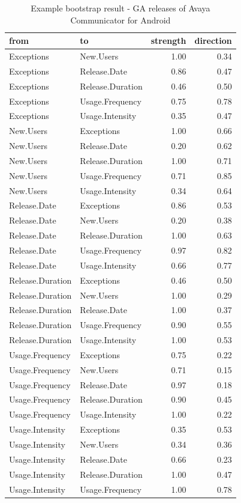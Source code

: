 \documentclass[smallextended]{svjour3}       %
\begin{document}
\begin{table}[ht]
\caption{Example bootstrap result - GA releases of Avaya Communicator for Android}\label{t:boot}
\centering
\begin{tabular}{llrr}
  \hline
 from & to & strength & direction \\ 
  \hline
Exceptions & New.Users & 1.00 & 0.34 \\ 
  Exceptions & Release.Date & 0.86 & 0.47 \\ 
  Exceptions & Release.Duration & 0.46 & 0.50 \\ 
  Exceptions & Usage.Frequency & 0.75 & 0.78 \\ 
  Exceptions & Usage.Intensity & 0.35 & 0.47 \\ 
  New.Users & Exceptions & 1.00 & 0.66 \\ 
  New.Users & Release.Date & 0.20 & 0.62 \\ 
  New.Users & Release.Duration & 1.00 & 0.71 \\ 
  New.Users & Usage.Frequency & 0.71 & 0.85 \\ 
  New.Users & Usage.Intensity & 0.34 & 0.64 \\ 
  Release.Date & Exceptions & 0.86 & 0.53 \\ 
  Release.Date & New.Users & 0.20 & 0.38 \\ 
  Release.Date & Release.Duration & 1.00 & 0.63 \\ 
  Release.Date & Usage.Frequency & 0.97 & 0.82 \\ 
  Release.Date & Usage.Intensity & 0.66 & 0.77 \\ 
  Release.Duration & Exceptions & 0.46 & 0.50 \\ 
  Release.Duration & New.Users & 1.00 & 0.29 \\ 
  Release.Duration & Release.Date & 1.00 & 0.37 \\ 
  Release.Duration & Usage.Frequency & 0.90 & 0.55 \\ 
  Release.Duration & Usage.Intensity & 1.00 & 0.53 \\ 
  Usage.Frequency & Exceptions & 0.75 & 0.22 \\ 
  Usage.Frequency & New.Users & 0.71 & 0.15 \\ 
  Usage.Frequency & Release.Date & 0.97 & 0.18 \\ 
  Usage.Frequency & Release.Duration & 0.90 & 0.45 \\ 
  Usage.Frequency & Usage.Intensity & 1.00 & 0.22 \\ 
  Usage.Intensity & Exceptions & 0.35 & 0.53 \\ 
  Usage.Intensity & New.Users & 0.34 & 0.36 \\ 
  Usage.Intensity & Release.Date & 0.66 & 0.23 \\ 
  Usage.Intensity & Release.Duration & 1.00 & 0.47 \\ 
  Usage.Intensity & Usage.Frequency & 1.00 & 0.78 \\ 
   \hline
\end{tabular}
\end{table}
\end{document}
